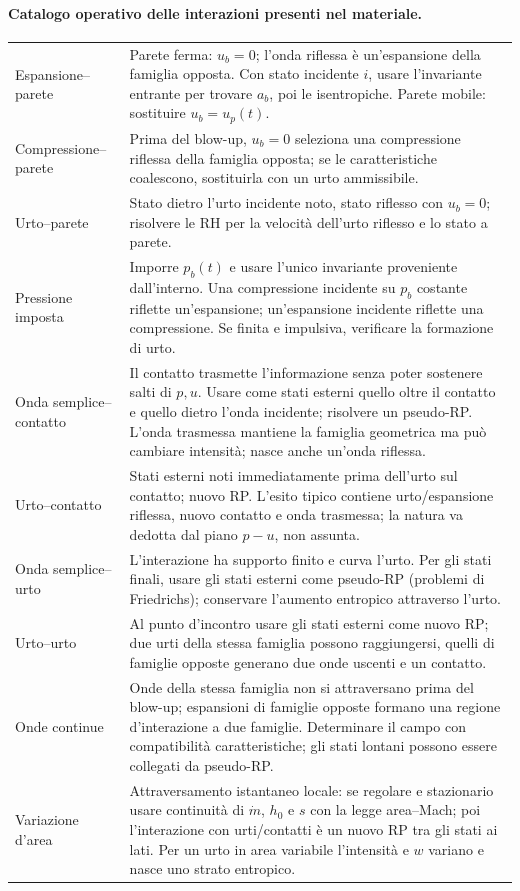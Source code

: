 \documentclass[11pt,a4paper]{article}
\begin{document}
\paragraph*{Catalogo operativo delle interazioni presenti nel materiale.}
\begin{longtable}{>{\raggedright\arraybackslash}p{}p{}}
Espansione--parete & Parete ferma: $u_b=0$; l'onda riflessa è un'espansione della famiglia opposta. Con stato incidente $i$, usare l'invariante entrante per trovare $a_b$, poi le isentropiche. Parete mobile: sostituire $u_b=u_p(t)$.\\
Compressione--parete & Prima del blow-up, $u_b=0$ seleziona una compressione riflessa della famiglia opposta; se le caratteristiche coalescono, sostituirla con un urto ammissibile.\\
Urto--parete & Stato dietro l'urto incidente noto, stato riflesso con $u_b=0$; risolvere le RH per la velocità dell'urto riflesso e lo stato a parete.\\
Pressione imposta & Imporre $p_b(t)$ e usare l'unico invariante proveniente dall'interno. Una compressione incidente su $p_b$ costante riflette un'espansione; un'espansione incidente riflette una compressione. Se finita e impulsiva, verificare la formazione di urto.\\
Onda semplice--contatto & Il contatto trasmette l'informazione senza poter sostenere salti di $p,u$. Usare come stati esterni quello oltre il contatto e quello dietro l'onda incidente; risolvere un pseudo-RP. L'onda trasmessa mantiene la famiglia geometrica ma può cambiare intensità; nasce anche un'onda riflessa.\\
Urto--contatto & Stati esterni noti immediatamente prima dell'urto sul contatto; nuovo RP. L'esito tipico contiene urto/espansione riflessa, nuovo contatto e onda trasmessa; la natura va dedotta dal piano $p-u$, non assunta.\\
Onda semplice--urto & L'interazione ha supporto finito e curva l'urto. Per gli stati finali, usare gli stati esterni come pseudo-RP (problemi di Friedrichs); conservare l'aumento entropico attraverso l'urto.\\
Urto--urto & Al punto d'incontro usare gli stati esterni come nuovo RP; due urti della stessa famiglia possono raggiungersi, quelli di famiglie opposte generano due onde uscenti e un contatto.\\
Onde continue & Onde della stessa famiglia non si attraversano prima del blow-up; espansioni di famiglie opposte formano una regione d'interazione a due famiglie. Determinare il campo con compatibilità caratteristiche; gli stati lontani possono essere collegati da pseudo-RP.\\
Variazione d'area & Attraversamento istantaneo locale: se regolare e stazionario usare continuità di $\dot m$, $h_0$ e $s$ con la legge area--Mach; poi l'interazione con urti/contatti è un nuovo RP tra gli stati ai lati. Per un urto in area variabile l'intensità e $w$ variano e nasce uno strato entropico.\\
\end{longtable}
\end{document}
